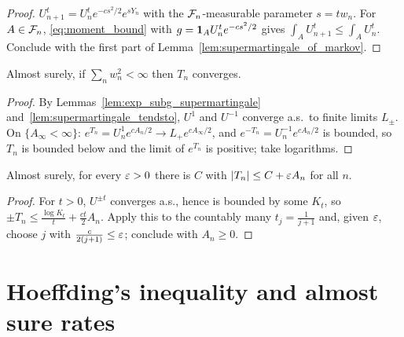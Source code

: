 \begin{proof}
  \leanok
  $U^t_{n+1} = U^t_n e^{-c s^2/2} e^{s Y_n}$ with the $\mathcal{F}_n$-measurable parameter $s = t w_n$. For
  $A \in \mathcal{F}_n$, \eqref{eq:moment_bound} with $g = \mathbf{1}_A U^t_n e^{-cs^2/2}$ gives $\int_A U^t_{n+1}
  \le \int_A U^t_n$. Conclude with the first part of Lemma~\ref{lem:supermartingale_of_markov}.
\end{proof}

\begin{lemma}
  \label{lem:subg_sum_tendsto}
  \leanok
  Almost surely, if $\sum_n w_n^2 < \infty$ then $T_n$ converges.
\end{lemma}

\begin{proof}
  \leanok
  By Lemmas~\ref{lem:exp_subg_supermartingale} and~\ref{lem:supermartingale_tendsto}, $U^1$ and
  $U^{-1}$ converge a.s.\ to finite limits $L_{\pm}$. On $\{A_\infty < \infty\}$:
  $e^{T_n} = U^1_n e^{cA_n/2} \to L_+ e^{cA_\infty/2}$, and $e^{-T_n} = U^{-1}_n e^{cA_n/2}$ is
  bounded, so $T_n$ is bounded below and the limit of $e^{T_n}$ is positive; take logarithms.
\end{proof}

\begin{lemma}
  \label{lem:subg_sum_little_o}
  \leanok
  Almost surely, for every $\varepsilon > 0$ there is $C$ with $\lvert T_n \rvert \le C + \varepsilon A_n$ for all $n$.
\end{lemma}

\begin{proof}
  \leanok
  For $t > 0$, $U^{\pm t}$ converges a.s., hence is bounded by some $K_t$, so
  $\pm T_n \le \frac{\log K_t}{t} + \frac{ct}{2} A_n$. Apply this to the countably many
  $t_j = \frac{1}{j+1}$ and, given $\varepsilon$, choose $j$ with $\frac{c}{2(j+1)} \le \varepsilon$; conclude with
  $A_n \ge 0$.
\end{proof}

\section{Hoeffding's inequality and almost sure rates}

